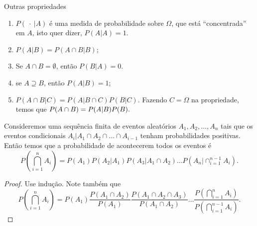 \begin{frame}{Outras propriedades}
	\begin{enumerate}
		
		\item $P(\ \cdot \ |A)$ é uma medida de probabilidade sobre $\Omega $, que está 
		``concentrada'' em $A$, isto quer dizer, $P(A|A)=1$.
		 \item $P(A|B)=P(A\cap B|B)$;
		\item Se $A\cap B=\emptyset $, então  $P(B|A)=0.$
		
		\item se $A\supseteq B$, então $P(A|B)=1$;
		\item $P(A\cap B|C)=P(A|B\cap C)P(B|C)$. 	Fazendo $C=\Omega$ na propriedade, temos que
		$P(A\cap B)=P(A|B)P(B).$
		\end{enumerate}
	

	

 \begin{teo}
	Consideremos uma sequência finita de  eventos aleatórios $A_1, A_2,\ldots, A_n$ tais que os eventos condicionais $ A_i|A_1\cap A_2\cap\ldots\cap A_{i-1} $ tenham probabilidades positivas. Então temos que a probabilidade de acontecerem todos os eventos é 
	\[P\left(\bigcap_{i=1}^nA_i\right)=P(A_1)P(A_2|A_1)P(A_3|A_1\cap A_2)\ldots P(A_n|\cap_{i=1}^{n-1}A_i).\] 	
\end{teo}
\begin{proof}Use indução. Note também que \[P\left(\bigcap_{i=1}^nA_i\right)=P(A_1)\frac{P(A_1\cap A_2)}{P(A_1)}\frac{P(A_1\cap A_2\cap A_3)}{P(A_1\cap A_2)}\ldots \frac{P(\bigcap_{i=1}^n A_i)}{P(\bigcap_{i=1}^{n-1} A_i)}.\] 	
\end{proof}

\end{frame}

